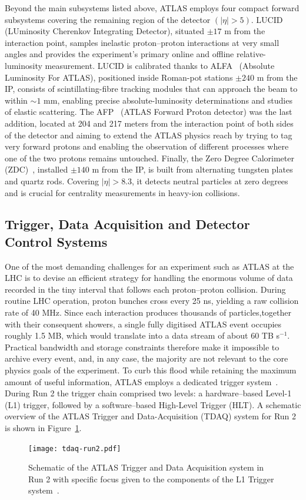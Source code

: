 Beyond the main subsystems listed above, ATLAS employs four compact forward subsystems covering the remaining region of the detector $(|\eta| > 5)$.
LUCID~\cite{Jenni:721908} (LUminosity Cherenkov Integrating Detector), situated $\pm17$ m from the interaction point, samples inelastic proton–proton interactions at very small angles and provides the experiment’s primary online and offline relative-luminosity measurement.  
LUCID is calibrated thanks to ALFA~\cite{Khalek_2016} (Absolute Luminosity For ATLAS), positioned inside Roman-pot stations $\pm240$ m from the IP, consists of scintillating-fibre tracking modules that can approach the beam to within $\sim\!1$ mm, enabling precise absolute-luminosity determinations and studies of elastic scattering.  
The AFP~\cite{Adamczyk:2015cjy} (ATLAS Forward Proton detector) was the last addition, located at 204 and 217 meters from the interaction point of both sides of the detector and aiming to extend the ATLAS physics reach by trying to tag very forward protons and enabling the observation of different processes where one of the two protons remains untouched.
Finally, the Zero Degree Calorimeter (ZDC)~\cite{Jenni:1009649}, installed $\pm140$ m from the IP, is built from alternating tungsten plates and quartz rods.  Covering $|\eta| > 8.3$, it detects neutral particles at zero degrees and is crucial for centrality measurements in heavy-ion collisions.

\subsection{Trigger, Data Acquisition and Detector Control Systems}
\label{sec:trigger}
One of the most demanding challenges for an experiment such as ATLAS at the LHC is to devise an efficient strategy for handling the enormous volume of data recorded in the tiny interval that follows each proton–proton collision. During routine LHC operation, proton bunches cross every 25 ns, yielding a raw collision rate of 40 MHz. Since each interaction produces thousands of particles,together with their consequent showers, a single fully digitised ATLAS event occupies roughly 1.5 MB, which would translate into a data stream of about 60 TB s$^{-1}$. Practical bandwidth and storage constraints therefore make it impossible to archive every event, and, in any case, the majority are not relevant to the core physics goals of the experiment. To curb this flood while retaining the maximum amount of useful information, ATLAS employs a dedicated trigger system~\cite{trigger_run2}. During Run 2 the trigger chain comprised two levels: a hardware–based Level-1 (L1) trigger, followed by a software–based High-Level Trigger (HLT). A schematic overview of the ATLAS Trigger and Data-Acquisition (TDAQ) system for Run 2 is shown in Figure~\ref{fig:trigger_system}.
\begin{figure}[htbp]
    \centering
        \texttt{[image: tdaq-run2.pdf]}
    \caption{Schematic of the ATLAS Trigger and Data Acquisition system in Run 2 with specific focus given to the components of the L1 Trigger system~\cite{atlas_daq_run2}.}
    \label{fig:trigger_system}
\end{figure}

